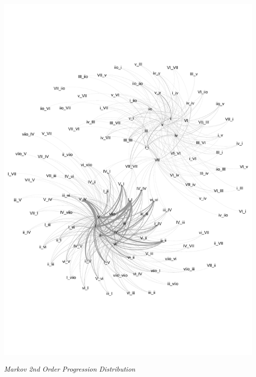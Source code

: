 \documentclass[12pt]{article}
\begin{document}
\begin{center}
\includegraphics[trim = 0 100 0 100, scale=.75]{markov3.pdf}
\end{center}
\begin{center}\emph{Markov 2nd Order Progression Distribution}\\ \end{center}
\end{document}
